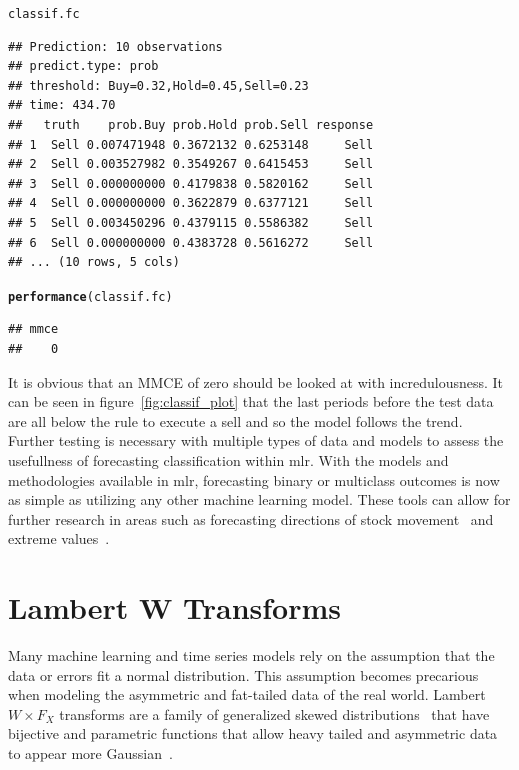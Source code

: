 \documentclass[12pt]{article}\usepackage[]{graphicx}\usepackage[]{color}
\makeatletter
\newcommand{\hlstd}[1]{\textcolor[rgb]{0.345,0.345,0.345}{#1}}%
\newcommand{\hlkwd}[1]{\textcolor[rgb]{0.737,0.353,0.396}{\textbf{#1}}}%
\newenvironment{kframe}{%
 \def\at@end@of@kframe{}%
 \ifinner\ifhmode%
  \def\at@end@of@kframe{\end{minipage}}%
  \begin{minipage}{\columnwidth}%
 \fi\fi%
 \def\FrameCommand##1{\hskip\@totalleftmargin \hskip-\fboxsep
 \colorbox{shadecolor}{##1}\hskip-\fboxsep
     \hskip-\linewidth \hskip-\@totalleftmargin \hskip\columnwidth}%
 \MakeFramed {\advance\hsize-\width
   \@totalleftmargin\z@ \linewidth\hsize
   \@setminipage}}%
 {\par\unskip\endMakeFramed%
 \at@end@of@kframe}
\newenvironment{knitrout}{}{} %
\theoremstyle{definition}
\newcommand{\pkg}[1]{{\fontseries{b}\selectfont #1}}
\makeatother
\begin{document}
\begin{knitrout}
\color{fgcolor}\begin{kframe}
\begin{alltt}
\hlstd{classif.fc}
\end{alltt}
\begin{verbatim}
## Prediction: 10 observations
## predict.type: prob
## threshold: Buy=0.32,Hold=0.45,Sell=0.23
## time: 434.70
##   truth    prob.Buy prob.Hold prob.Sell response
## 1  Sell 0.007471948 0.3672132 0.6253148     Sell
## 2  Sell 0.003527982 0.3549267 0.6415453     Sell
## 3  Sell 0.000000000 0.4179838 0.5820162     Sell
## 4  Sell 0.000000000 0.3622879 0.6377121     Sell
## 5  Sell 0.003450296 0.4379115 0.5586382     Sell
## 6  Sell 0.000000000 0.4383728 0.5616272     Sell
## ... (10 rows, 5 cols)
\end{verbatim}
\begin{alltt}
\hlkwd{performance}\hlstd{(classif.fc)}
\end{alltt}
\begin{verbatim}
## mmce 
##    0
\end{verbatim}
\end{kframe}
\end{knitrout}
\doublespacing

It is obvious that an MMCE of zero should be looked at with incredulousness. It can be seen in figure~\ref{fig:classif_plot} that the last periods before the test data are all below the rule to execute a sell and so the model follows the trend. Further testing is necessary with multiple types of data and models to assess the usefullness of forecasting classification within \pkg{mlr}. With the models and methodologies available in \pkg{mlr}, forecasting binary or multiclass outcomes is now as simple as utilizing any other machine learning model. These tools can allow for further research in areas such as forecasting directions of stock movement~\cite{markClassifStock} and extreme values~\cite{Chen2015UsingEV}. 

\section{Lambert W Transforms}
\label{sec:lambert}
Many machine learning and time series models rely on the assumption that the data or errors fit a normal distribution. This assumption becomes precarious when modeling the asymmetric and fat-tailed data of the real world. Lambert $W\times F_X$ transforms are a family of generalized skewed distributions~\cite{LambertGeneral} that have bijective and parametric functions that allow heavy tailed and asymmetric data to appear more Gaussian~\cite{GaussLam}. 
\end{document}
